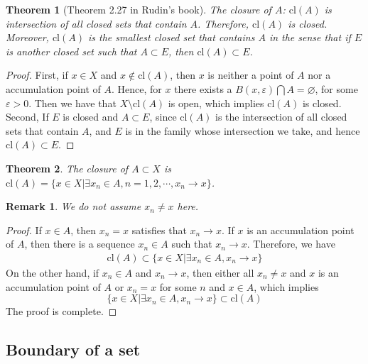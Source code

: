 \documentclass[12pt,leqno]{amsart}
\newtheorem{theorem}{Theorem}[section]
\newtheorem{remark}{Remark}[section]
\theoremstyle{definition}
\begin{document}
\begin{theorem}[Theorem 2.27 in Rudin's book]
The closure of $A$: $\text{cl}(A)$ is intersection of all closed sets that contain $A$. Therefore, $\text{cl}(A)$ is closed. Moreover, $\text{cl}(A)$ is the smallest closed set that contains $A$ in the sense that if $E$ is another closed set such that $A\subset E$, then $\text{cl}(A)\subset E$.
\end{theorem}
\begin{proof}
First, if $x\in X$ and $x\notin \text{cl}(A)$, then $x$ is neither a point of $A$ nor a accumulation point of $A$. Hence, for $x$ there exists a $B(x,\varepsilon) \bigcap A = \varnothing$, for some $\varepsilon > 0$. Then we have that $X\setminus \text{cl}(A)$ is open, which implies $\text{cl}(A)$ is closed. \\
\hspace*{3em}Second, If $E$ is closed and $A\subset E$, since $\text{cl}(A)$ is the intersection of all closed sets that contain $A$, and $E$ is in the family whose intersection we take, and hence $\text{cl}(A)\subset E$.
\end{proof}

\medskip

\begin{theorem}
The closure of $A\subset X$ is $\text{cl}(A) = \{x\in X|\exists x_n\in A, n = 1,2,\cdots, x_n\to x\}$.
\end{theorem}
\begin{remark}
We do not assume $x_n \neq x$ here.
\end{remark}
\begin{proof}
If $x\in A$, then $x_n = x$ satisfies that $x_n\to x$. If $x$ is an accumulation point of $A$, then there is a sequence $x_n\in A$ such that $x_n\to x$. Therefore, we have 
\begin{align*}
    \text{cl}(A) \subset \{x\in X|\exists x_n\in A,  x_n\to x\}
\end{align*}
On the other hand, if $x_n\in A$ and $x_n\to x$, then either all $x_n \neq x$ and $x$ is an accumulation point of $A$ or $x_n  = x$ for some $n$ and $x\in A$, which implies $$\{x\in X|\exists x_n\in A,  x_n\to x\}\subset \text{cl}(A)$$
The proof is complete.
\end{proof}

\medskip

\subsection{Boundary of a set}
\end{document}
